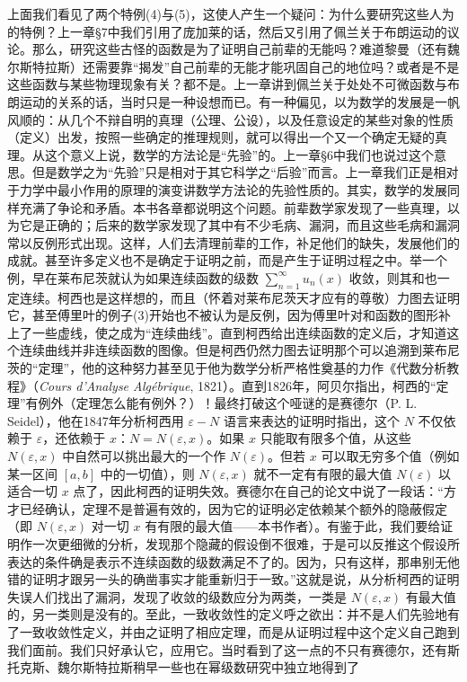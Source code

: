 上面我们看见了两个特例(4)与(5)，这使人产生一个疑问：为什么要研究这些人为的特例？上一章\S7中我们引用了庞加莱的话，然后又引用了佩兰关于布朗运动的议论。那么，研究这些古怪的函数是为了证明自己前辈的无能吗？难道黎曼（还有魏尔斯特拉斯）还需要靠“揭发”自己前辈的无能才能巩固自己的地位吗？或者是不是这些函数与某些物理现象有关？都不是。上一章讲到佩兰关于处处不可微函数与布朗运动的关系的话，当时只是一种设想而已。有一种偏见，以为数学的发展是一帆风顺的：从几个不辩自明的真理（公理、公设），以及任意设定的某些对象的性质（定义）出发，按照一些确定的推理规则，就可以得出一个又一个确定无疑的真理。从这个意义上说，数学的方法论是“先验”的。上一章\S6中我们也说过这个意思。但是数学之为“先验”只是相对于其它科学之“后验”而言。上一章我们正是相对于力学中最小作用的原理的演变讲数学方法论的先验性质的。其实，数学的发展同样充满了争论和矛盾。本书各章都说明这个问题。前辈数学家发现了一些真理，以为它是正确的；后来的数学家发现了其中有不少毛病、漏洞，而且这些毛病和漏洞常以反例形式出现。这样，人们去清理前辈的工作，补足他们的缺失，发展他们的成就。甚至许多定义也不是确定于证明之前，而是产生于证明过程之中。举一个例，早在莱布尼茨就认为如果连续函数的级数 $\sum_{n=1}^{\infty}u_n(x)$ 收敛，则其和也一定连续。柯西也是这样想的，而且（怀着对莱布尼茨天才应有的尊敬）力图去证明它，甚至傅里叶的例子(3)开始也不被认为是反例，因为傅里叶对和函数的图形补上了一些虚线，使之成为“连续曲线”。直到柯西给出连续函数的定义后，才知道这个连续曲线并非连续函数的图像。但是柯西仍然力图去证明那个可以追溯到莱布尼茨的“定理”，他的这种努力甚至见于他为数学分析严格性奠基的力作《代数分析教程》（\textit{Cours d'Analyse Algébrique}, 1821）。直到1826年，阿贝尔指出，柯西的“定理”有例外（定理怎么能有例外？）！最终打破这个哑谜的是赛德尔（P. L. Seidel），他在1847年分析柯西用 $\varepsilon-N$ 语言来表达的证明时指出，这个 $N$ 不仅依赖于 $\varepsilon$，还依赖于 $x$：$N=N(\varepsilon,x)$。如果 $x$ 只能取有限多个值，从这些 $N(\varepsilon,x)$ 中自然可以挑出最大的一个作 $N(\varepsilon)$。但若 $x$ 可以取无穷多个值（例如某一区间 $[a,b]$ 中的一切值），则 $N(\varepsilon,x)$ 就不一定有有限的最大值 $N(\varepsilon)$ 以适合一切 $x$ 点了，因此柯西的证明失效。赛德尔在自己的论文中说了一段话：“方才已经确认，定理不是普遍有效的，因为它的证明必定依赖某个额外的隐蔽假定（即 $N(\varepsilon,x)$ 对一切 $x$ 有有限的最大值——本书作者）。有鉴于此，我们要给证明作一次更细微的分析，发现那个隐藏的假设倒不很难，于是可以反推这个假设所表达的条件确是表示不连续函数的级数满足不了的。因为，只有这样，那串别无他错的证明才跟另一头的确凿事实才能重新归于一致。”这就是说，从分析柯西的证明失误人们找出了漏洞，发现了收敛的级数应分为两类，一类是 $N(\varepsilon,x)$ 有最大值的，另一类则是没有的。至此，一致收敛性的定义呼之欲出：并不是人们先验地有了一致收敛性定义，并由之证明了相应定理，而是从证明过程中这个定义自己跑到我们面前。我们只好承认它，应用它。当时看到了这一点的不只有赛德尔，还有斯托克斯、魏尔斯特拉斯稍早一些也在幂级数研究中独立地得到了 